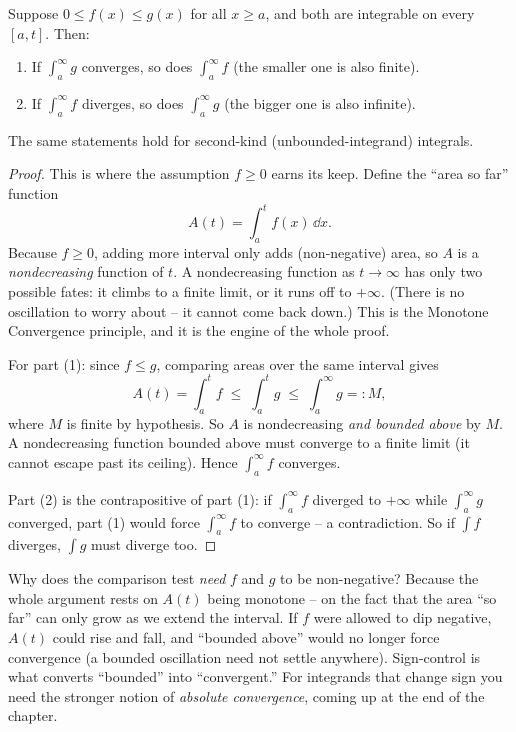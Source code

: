 \begin{theorem}
\label{ch25:thm-comparison}
Suppose $0 \le f(x) \le g(x)$ for all $x \ge a$, and both are integrable on every
$[a,t]$. Then:
\begin{enumerate}
  \item If $\displaystyle\int_a^{\infty} g$ converges, so does
  $\displaystyle\int_a^{\infty} f$ (the smaller one is also finite).
  \item If $\displaystyle\int_a^{\infty} f$ diverges, so does
  $\displaystyle\int_a^{\infty} g$ (the bigger one is also infinite).
\end{enumerate}
The same statements hold for second-kind (unbounded-integrand) integrals.
\end{theorem}

\begin{proof}
This is where the assumption $f \ge 0$ earns its keep. Define the ``area so far''
function
\[
  A(t) = \int_a^{t} f(x)\,\dd x.
\]
Because $f \ge 0$, adding more interval only adds (non-negative) area, so $A$ is a
\emph{nondecreasing} function of $t$. A nondecreasing function as $t\to\infty$ has
only two possible fates: it climbs to a finite limit, or it runs off to $+\infty$.
(There is no oscillation to worry about -- it cannot come back down.) This is the
Monotone Convergence principle, and it is the engine of the whole proof.

For part (1): since $f \le g$, comparing areas over the same interval gives
\[
  A(t) = \int_a^{t} f \;\le\; \int_a^{t} g \;\le\; \int_a^{\infty} g =: M,
\]
where $M$ is finite by hypothesis. So $A$ is nondecreasing \emph{and bounded above}
by $M$. A nondecreasing function bounded above must converge to a finite limit
(it cannot escape past its ceiling). Hence $\int_a^\infty f$ converges.

Part (2) is the contrapositive of part (1): if $\int_a^\infty f$ diverged to
$+\infty$ while $\int_a^\infty g$ converged, part (1) would force $\int_a^\infty f$
to converge -- a contradiction. So if $\int f$ diverges, $\int g$ must diverge too.
\end{proof}

\begin{whybox}
Why does the comparison test \emph{need} $f$ and $g$ to be non-negative? Because
the whole argument rests on $A(t)$ being monotone -- on the fact that the area
``so far'' can only grow as we extend the interval. If $f$ were allowed to dip
negative, $A(t)$ could rise and fall, and ``bounded above'' would no longer force
convergence (a bounded oscillation need not settle anywhere). Sign-control is what
converts ``bounded'' into ``convergent.'' For integrands that change sign you need
the stronger notion of \emph{absolute convergence}, coming up at the end of the
chapter.
\end{whybox}

